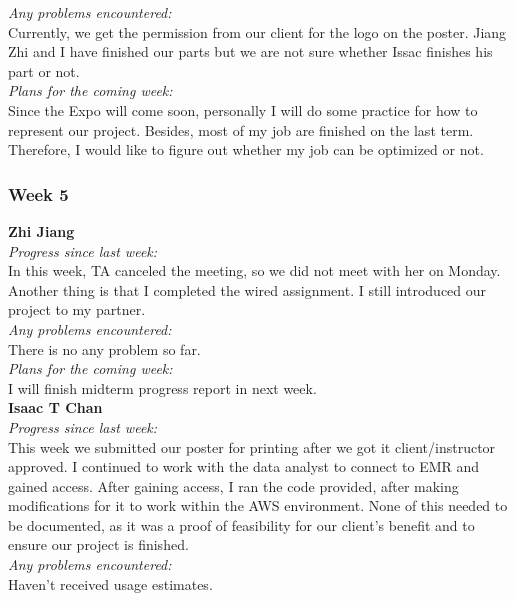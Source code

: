 \noindent\textit{Any problems encountered:}\\
Currently, we get the permission from our client for the logo on the poster. Jiang Zhi and I have finished our parts but we are not sure whether Issac finishes his part or not.\\

\noindent\textit{Plans for the coming week:}\\
Since the Expo will come soon, personally I will do some practice for how to represent our project. Besides, most of my job are finished on the last term. Therefore, I would like to figure out whether my job can be optimized or not.\\

\subsubsection{Week 5}
\textbf{Zhi Jiang}\\
\noindent\textit{Progress since last week:}\\
In this week, TA canceled the meeting, so we did not meet with her on Monday. Another thing is that I completed the wired assignment. I still introduced our project to my partner.\\

\noindent\textit{Any problems encountered:}\\
There is no any problem so far.\\

\noindent\textit{Plans for the coming week:}\\
I will finish midterm progress report in next week.\\

\noindent\textbf{Isaac T Chan}\\
\noindent\textit{Progress since last week:}\\
This week we submitted our poster for printing after we got it client/instructor approved. I continued to work with the data analyst to connect to EMR and gained access. After gaining access, I ran the code provided, after making modifications for it to work within the AWS environment. None of this needed to be documented, as it was a proof of feasibility for our client's benefit and to ensure our project is finished.\\

\noindent\textit{Any problems encountered:}\\
Haven't received usage estimates.\\


